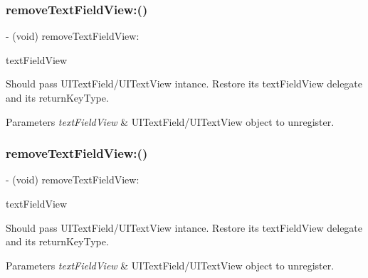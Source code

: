 \subsubsection{\texorpdfstring{remove\+Text\+Field\+View\+:()}{removeTextFieldView:()}\hspace{0.1cm}{\footnotesize\ttfamily [1/3]}}
{\footnotesize\ttfamily -\/ (void) remove\+Text\+Field\+View\+: \begin{DoxyParamCaption}\item[{(nonnull U\+I\+View $\ast$)}]{text\+Field\+View }\end{DoxyParamCaption}}

Should pass U\+I\+Text\+Field/\+U\+I\+Text\+View intance. Restore it\textquotesingle{}s text\+Field\+View delegate and it\textquotesingle{}s return\+Key\+Type.


\begin{DoxyParams}{Parameters}
{\em text\+Field\+View} & U\+I\+Text\+Field/\+U\+I\+Text\+View object to unregister. \\
\hline
\end{DoxyParams}
\mbox{\label{interface_i_q_keyboard_return_key_handler_ac88fa6e388c4a0040095bde01c1a721d}} 
\subsubsection{\texorpdfstring{remove\+Text\+Field\+View\+:()}{removeTextFieldView:()}\hspace{0.1cm}{\footnotesize\ttfamily [2/3]}}
{\footnotesize\ttfamily -\/ (void) remove\+Text\+Field\+View\+: \begin{DoxyParamCaption}\item[{(nonnull U\+I\+View $\ast$)}]{text\+Field\+View }\end{DoxyParamCaption}}

Should pass U\+I\+Text\+Field/\+U\+I\+Text\+View intance. Restore it\textquotesingle{}s text\+Field\+View delegate and it\textquotesingle{}s return\+Key\+Type.


\begin{DoxyParams}{Parameters}
{\em text\+Field\+View} & U\+I\+Text\+Field/\+U\+I\+Text\+View object to unregister. \\
\hline
\end{DoxyParams}
\mbox{\label{interface_i_q_keyboard_return_key_handler_ac88fa6e388c4a0040095bde01c1a721d}} 
